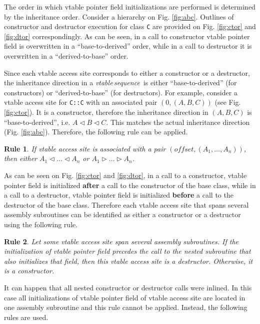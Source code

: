 \documentclass[times, 10pt,twocolumn]{article}
\newtheorem{rulez}{Rule}
\newcommand{\offset}{\textit{offset}}
\newcommand{\vtable}{\textit{vtable}}
\newcommand{\sequence}{\textit{sequence}}
\renewcommand{\~}{{\raise.35ex\hbox{$\scriptstyle\sim$}}}
\begin{document}
The order in which vtable pointer field initializations are performed
is determined by the inheritance order. Consider a hierarchy
on Fig. \ref{fig:abc}.
Outlines of constructor and destructor execution for class
\lstinline{C} are provided on Fig. \ref{fig:ctor} and \ref{fig:dtor}
correspondingly. As can be seen, in a call to constructor vtable
pointer field is overwritten in a ``base-to-derived'' order,
while in a call to destructor it is overwritten in a
``derived-to-base'' order.

Since each vtable access site corresponds to either a constructor
or a destructor, the inheritance direction in a \vtable\,\sequence~is
either ``base-to-derived'' (for constructors) or ``derived-to-base'' (for destructors).
For example, consider a vtable access site for \lstinline{C::C} with an associated pair
$(0, (A, B, C))$ (see Fig. \ref{fig:ctor}). It is a constructor, therefore
the inheritance direction in $(A, B, C)$ is ``base-to-derived'',
i.e. $A \lhd B \lhd C$. This matches the actual
inheritance direction (Fig. \ref{fig:abc}). Therefore, the following rule
can be applied.

\begin{rulez}
If \textit{vtable access site} is associated with a pair $(\offset, (A_1, \ldots, A_n))$,
then either $A_1 \lhd \ldots \lhd A_n$ or $A_1 \rhd \ldots \rhd A_n$.
\end{rulez}

As can be seen on Fig. \ref{fig:ctor} and \ref{fig:dtor},
in a call to a constructor, vtable pointer field is initialized \textbf{after} a
call to the constructor of the base class, while in a call to a destructor,
vtable pointer field is initialized \textbf{before} a call to the destructor of
the base class. Therefore each vtable access site that spans
several assembly subroutines can be identified as either a constructor or
a destructor using the following rule.

\begin{rulez}
Let some vtable access site span several assembly subroutines. If the initialization of
vtable pointer field precedes the call to the nested subroutine that also initializes that field,
then this vtable access site is a destructor. Otherwise,
it is a constructor.
\end{rulez}

It can happen that all nested constructor or destructor calls were inlined.
In this case all initializations of vtable pointer field of
vtable access site are located in one assembly subroutine and this rule cannot be applied.
Instead, the following rules are used.
\end{document}
